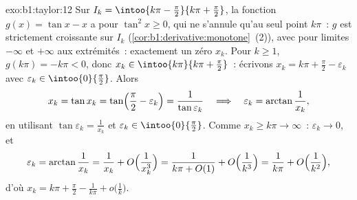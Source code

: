 \begin{solution}{exo:b1:taylor:12}
Sur $I_k = \intoo{k\pi - \frac\pi2}{k\pi + \frac\pi2}$, la
fonction $g(x) = \tan x - x$ a pour  $\tan^2 x \geq 0$, qui ne
s'annule qu'au seul point $k\pi$~: $g$ est strictement
croissante sur $I_k$ (\cref{cor:b1:derivative:monotone}~(2)),
avec pour limites $-\infty$ et $+\infty$ aux extrémités~: exactement un
zéro $x_k$. Pour $k \geq 1$, $g(k\pi) = -k\pi < 0$, donc $x_k \in
\intoo{k\pi}{k\pi + \frac\pi2}$~: écrivons $x_k = k\pi + \frac\pi2 -
\varepsilon_k$ avec $\varepsilon_k \in \intoo{0}{\frac\pi2}$.
Alors
\[
x_k = \tan x_k = \tan\Bigl(\frac\pi2 - \varepsilon_k\Bigr)
= \frac{1}{\tan\varepsilon_k}
\quad\Longrightarrow\quad
\varepsilon_k = \arctan\frac{1}{x_k} ,
\]
en utilisant $\tan\varepsilon_k = \frac{1}{x_k}$ et $\varepsilon_k \in
\intoo{0}{\frac\pi2}$. Comme $x_k \geq k\pi \to \infty$~:
$\varepsilon_k \to 0$, et
\[
\varepsilon_k = \arctan\frac{1}{x_k} = \frac{1}{x_k} +
O\Bigl(\frac{1}{x_k^3}\Bigr)
= \frac{1}{k\pi + O(1)} + O\Bigl(\frac{1}{k^3}\Bigr)
= \frac{1}{k\pi} + O\Bigl(\frac{1}{k^2}\Bigr) ,
\]
d'où $x_k = k\pi + \frac\pi2 - \frac{1}{k\pi} +
o\bigl(\frac1k\bigr)$.
\end{solution}

